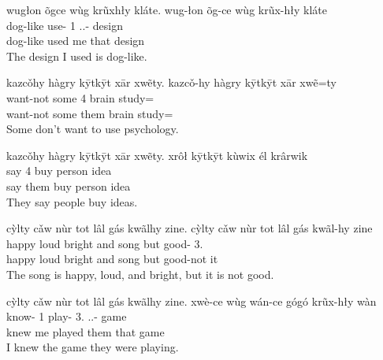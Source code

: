 \documentclass[12pt]{article}
\begin{document}
    \begin{exe}
        \ex
        wugłon õgce wùg krũxhły kláte.
        \glll
        wug-łon õg-ce wùg krũx-hły kláte \\
        dog-like use-\Pst{} 1\Sg{} \Dem{}.\Inanim{}.\Dist{}-\Adj{} design \\
        dog-like used me that design \\
        \glt
        The design I used is dog-like.
    \end{exe}

    \begin{exe}
        \ex
        kazcǒhy hàgry kȳtkȳt xār xwẽty.
        \glll
        kazcǒ-hy hàgry kȳtkȳt xār xwẽ=ty \\
        want-not some 4\Pl{} brain study=\Poss{} \\
        want-not some them brain study=\Poss{} \\
        \glt
        Some don't want to use psychology.
    \end{exe}

    \begin{exe}
        \ex
        kazcǒhy hàgry kȳtkȳt xār xwẽty.
        \glll
        xrôł kȳtkȳt kùwix él krârwik \\
        say 4\Pl{} buy person idea \\
        say them buy person idea \\
        \glt
        They say people buy ideas.
    \end{exe}

    \begin{exe}
        \ex
        cỳlty cǎw nùr tot lâl gás kwãlhy zine.
        \glll
        cỳlty cǎw nùr tot lâl gás kwãl-hy zine \\
        happy loud bright and song but good-\Neg{} 3\Sg{}.\Inanim{} \\
        happy loud bright and song but good-not it \\
        \glt
        The song is happy, loud, and bright, but it is not good.
    \end{exe}

    \begin{exe}
        \ex
        cỳlty cǎw nùr tot lâl gás kwãlhy zine.
        \glll
        xwè-ce wùg wán-ce gógó krũx-hły wàn \\
        know-\Pst{} 1\Sg{} play-\Pst{} 3\Pl{}.\Anim{} \Dem{}.\Inanim{}.\Dist{}-\Adj{} game \\
        knew me played them that game \\
        \glt
        I knew the game they were playing.
    \end{exe}
\end{document}

